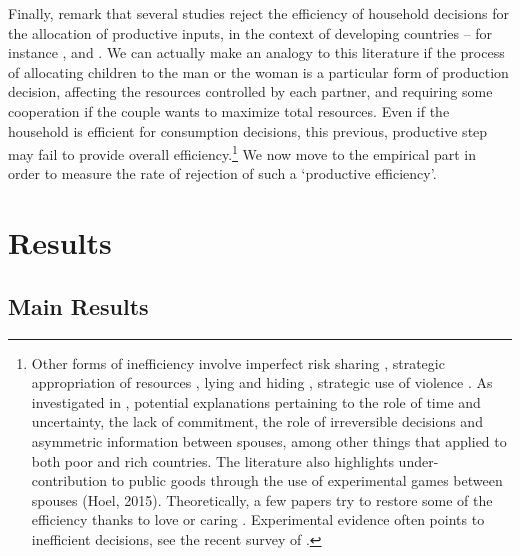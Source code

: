 \medskip 
Finally, remark that several studies reject the efficiency of household decisions for the allocation of productive inputs, in the context of developing countries – for instance \citet{udry1996gender}, \citet{duflo2004intrahousehold} and \citet{apedo2017}.
 We can actually make an analogy to this literature if the process of allocating children to the man or the woman is a particular form of production decision, affecting the resources controlled by each partner, and requiring some cooperation if the couple wants to maximize total resources. Even if the household is efficient for consumption decisions, this previous, productive step may fail to provide overall efficiency.\footnote{
     Other forms of inefficiency involve imperfect risk sharing \citep{dercon2000sickness,robinson2012limited}, strategic appropriation of resources \citep{anderson2002economics}, lying and hiding \citep{ashraf2009spousal}, strategic use of violence \citep{bloch2002terror}. As investigated in \citet{baland2017intra}, potential explanations pertaining to the role of time and uncertainty, the lack of commitment, the role of irreversible decisions and asymmetric information between spouses, among other things that applied to both poor and rich countries. The literature also highlights under-contribution to public goods through the use of experimental games between spouses (Hoel, 2015).  Theoretically, a few papers try to restore some of the efficiency thanks to love or caring \citep{browning2009consumption, cherchye2015noncooperative}. Experimental evidence often points to inefficient decisions, see the recent survey of \citet{munro2018intra}.}
We now move to the empirical part in order to measure the rate of rejection of such a `productive efficiency’.
\section{Results}
\subsection{Main Results}
